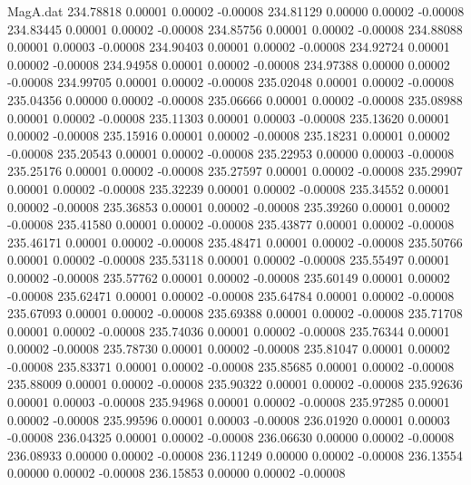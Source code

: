 \begin{filecontents}{MagA.dat}
 234.78818    0.00001    0.00002   -0.00008
 234.81129    0.00000    0.00002   -0.00008
 234.83445    0.00001    0.00002   -0.00008
 234.85756    0.00001    0.00002   -0.00008
 234.88088    0.00001    0.00003   -0.00008
 234.90403    0.00001    0.00002   -0.00008
 234.92724    0.00001    0.00002   -0.00008
 234.94958    0.00001    0.00002   -0.00008
 234.97388    0.00000    0.00002   -0.00008
 234.99705    0.00001    0.00002   -0.00008
 235.02048    0.00001    0.00002   -0.00008
 235.04356    0.00000    0.00002   -0.00008
 235.06666    0.00001    0.00002   -0.00008
 235.08988    0.00001    0.00002   -0.00008
 235.11303    0.00001    0.00003   -0.00008
 235.13620    0.00001    0.00002   -0.00008
 235.15916    0.00001    0.00002   -0.00008
 235.18231    0.00001    0.00002   -0.00008
 235.20543    0.00001    0.00002   -0.00008
 235.22953    0.00000    0.00003   -0.00008
 235.25176    0.00001    0.00002   -0.00008
 235.27597    0.00001    0.00002   -0.00008
 235.29907    0.00001    0.00002   -0.00008
 235.32239    0.00001    0.00002   -0.00008
 235.34552    0.00001    0.00002   -0.00008
 235.36853    0.00001    0.00002   -0.00008
 235.39260    0.00001    0.00002   -0.00008
 235.41580    0.00001    0.00002   -0.00008
 235.43877    0.00001    0.00002   -0.00008
 235.46171    0.00001    0.00002   -0.00008
 235.48471    0.00001    0.00002   -0.00008
 235.50766    0.00001    0.00002   -0.00008
 235.53118    0.00001    0.00002   -0.00008
 235.55497    0.00001    0.00002   -0.00008
 235.57762    0.00001    0.00002   -0.00008
 235.60149    0.00001    0.00002   -0.00008
 235.62471    0.00001    0.00002   -0.00008
 235.64784    0.00001    0.00002   -0.00008
 235.67093    0.00001    0.00002   -0.00008
 235.69388    0.00001    0.00002   -0.00008
 235.71708    0.00001    0.00002   -0.00008
 235.74036    0.00001    0.00002   -0.00008
 235.76344    0.00001    0.00002   -0.00008
 235.78730    0.00001    0.00002   -0.00008
 235.81047    0.00001    0.00002   -0.00008
 235.83371    0.00001    0.00002   -0.00008
 235.85685    0.00001    0.00002   -0.00008
 235.88009    0.00001    0.00002   -0.00008
 235.90322    0.00001    0.00002   -0.00008
 235.92636    0.00001    0.00003   -0.00008
 235.94968    0.00001    0.00002   -0.00008
 235.97285    0.00001    0.00002   -0.00008
 235.99596    0.00001    0.00003   -0.00008
 236.01920    0.00001    0.00003   -0.00008
 236.04325    0.00001    0.00002   -0.00008
 236.06630    0.00000    0.00002   -0.00008
 236.08933    0.00000    0.00002   -0.00008
 236.11249    0.00000    0.00002   -0.00008
 236.13554    0.00000    0.00002   -0.00008
 236.15853    0.00000    0.00002   -0.00008

\end{filecontents}
